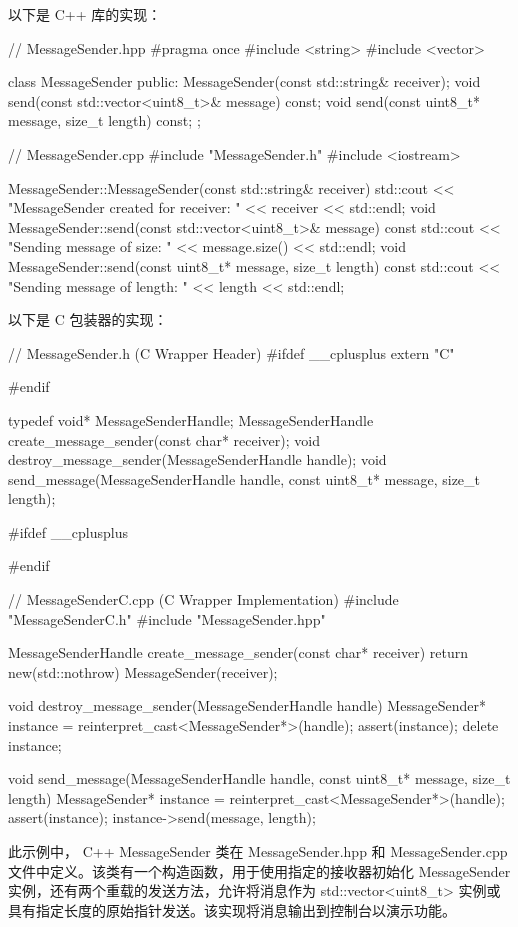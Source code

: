 以下是 C++ 库的实现：

\begin{cpp}
// MessageSender.hpp
#pragma once
#include <string>
#include <vector>

class MessageSender {
public:
    MessageSender(const std::string& receiver);
    void send(const std::vector<uint8_t>& message) const;
    void send(const uint8_t* message, size_t length) const;
};

// MessageSender.cpp
#include "MessageSender.h"
#include <iostream>

MessageSender::MessageSender(const std::string& receiver) {
    std::cout << "MessageSender created for receiver: " << receiver <<
std::endl;
}
void MessageSender::send(const std::vector<uint8_t>& message) const {
    std::cout << "Sending message of size: " << message.size() <<
std::endl;
}
void MessageSender::send(const uint8_t* message, size_t length) const
{
    std::cout << "Sending message of length: " << length << std::endl;
}
\end{cpp}

以下是 C 包装器的实现：

\begin{cpp}
// MessageSender.h (C Wrapper Header)
#ifdef __cplusplus
extern "C" {
#endif

typedef void* MessageSenderHandle;
MessageSenderHandle create_message_sender(const char* receiver);
void destroy_message_sender(MessageSenderHandle handle);
void send_message(MessageSenderHandle handle, const uint8_t* message, size_t length);

#ifdef __cplusplus
}
#endif

// MessageSenderC.cpp (C Wrapper Implementation)
#include "MessageSenderC.h"
#include "MessageSender.hpp"

MessageSenderHandle create_message_sender(const char* receiver) {
    return new(std::nothrow) MessageSender(receiver);
}

void destroy_message_sender(MessageSenderHandle handle) {
    MessageSender* instance = reinterpret_cast<MessageSender*>(handle);
    assert(instance);
    delete instance;
}

void send_message(MessageSenderHandle handle, const uint8_t* message, size_t length) {
    MessageSender* instance = reinterpret_cast<MessageSender*>(handle);
    assert(instance);
    instance->send(message, length);
}
\end{cpp}

此示例中， C++ MessageSender 类在 MessageSender.hpp 和 MessageSender.cpp 文件中定义。该类有一个构造函数，用于使用指定的接收器初始化 MessageSender 实例，还有两个重载的发送方法，允许将消息作为 std::vector<uint8\_t> 实例或具有指定长度的原始指针发送。该实现将消息输出到控制台以演示功能。

